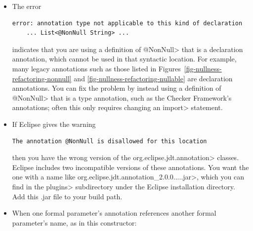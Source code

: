 \begin{itemize}
\noindent
might stem from use of raw types.  (``\<String>'' might be a different type
and might have type annotations.)  If your declaration was

\begin{Verbatim}
  DefaultListModel myModel;
\end{Verbatim}

\noindent
then it should be
\begin{Verbatim}
  DefaultListModel<String> myModel;
\end{Verbatim}

Running the regular Java compiler with the \<-Xlint:unchecked> command-line
option will help you to find and fix problems such as raw types.


\item
The error

\begin{Verbatim}
error: annotation type not applicable to this kind of declaration
    ... List<@NonNull String> ...
\end{Verbatim}

\noindent
indicates that you are using a definition of \<@NonNull> that is a
declaration annotation, which cannot be used in that syntactic location.
For example, many legacy annotations such as those listed in
Figures~\ref{fig-nullness-refactoring-nonnull} and \ref{fig-nullness-refactoring-nullable}
are declaration annotations.  You can
fix the problem by instead using a definition of \<@NonNull> that is a type
annotation, such as the Checker Framework's annotations; often this only
requires changing an \<import> statement.


\item
If Eclipse gives the warning

\begin{Verbatim}
The annotation @NonNull is disallowed for this location
\end{Verbatim}

\noindent
then you have the wrong version of the \<org.eclipse.jdt.annotation>
classes.  Eclipse includes two incompatible versions of these annotations.
You want the one with a name like
\<org.eclipse.jdt.annotation\_2.0.0.....jar>, which you can find in the
\<plugins> subdirectory under the Eclipse installation directory.
Add this .jar file to your build path.


\item
When one formal parameter's annotation references another formal
parameter's name, as in this constructor:


\end{itemize}
